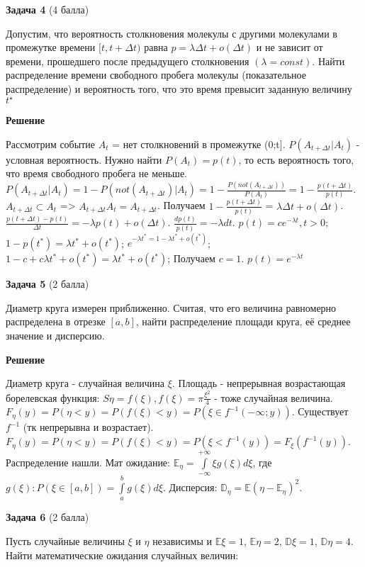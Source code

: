 \documentclass{article}
\begin{document}
\textbf{Задача 4} (4 балла)

Допустим, что вероятность столкновения молекулы с другими молекулами в
промежутке времени $[t, t + \Delta t)$ равна $p = \lambda\Delta t+o(\Delta t)$ и не зависит от времени, прошедшего
после предыдущего столкновения $(\lambda = const)$. Найти распределение времени свободного
пробега молекулы (показательное распределение) и вероятность того, что это время превысит заданную величину $t^{\star}$

\textbf{Решение}

Рассмотрим событие $A_t$ = нет столкновений в промежутке (0;t].
$P(A_{t+\Delta t}|A_t)$ - условная вероятность. Нужно найти $P(A_t) = p(t)$, то есть вероятность того, что время свободного пробега не меньше.
$P(A_{t+\Delta t}|A_t) = 1 - P(not(A_{t+\Delta t})|A_t) = 1 - \frac{P(not(A_{t+\Delta t}))}{P(A_t)} = 1 - \frac{p(t+\Delta t)}{p(t)}$.
$A_{t+\Delta t} \subset A_t$ => $A_{t+\Delta t} A_t = A_{t+\Delta t}$.
Получаем $1 - \frac{p(t+\Delta t)}{p(t)}$ = $\lambda\Delta t+o(\Delta t)$. 
$\frac{p(t+\Delta t) - p(t)}{\Delta t} = -\lambda p(t) + o(\Delta t)$.
$\frac{dp(t)}{p(t)} = -\lambda dt$.
$p(t) = ce^{-\lambda t}, t > 0$;
$1 - p(t^*) = \lambda t^* + o(t^*)$;
$e^{-\lambda t^* = 1 - \lambda t^* + o(t^*)}$;
$1 - c + c\lambda t^* + o(t^*) = \lambda t^* + o(t^*)$;
Получаем $c = 1$.
$p(t) = e^{-\lambda t}$


\textbf{Задача 5} (2 балла)

Диаметр круга измерен приближенно. Считая, что его величина равномерно распределена в отрезке $[a, b]$, найти распределение площади круга, её среднее значение и дисперсию.

\textbf{Решение}

Диаметр круга - случайная величина $\xi$. Площадь - непрерывная возрастающая борелевская функция: $S \eta = f(\xi), f(\xi) = \pi\frac{\xi^2}{4}$ - тоже случайная величина. $F_{\eta}(y) = P(\eta < y) = P(f(\xi) < y) = P(\xi \in f^{-1}(-\infty; y))$. Существует $f^{-1}$ (тк непрерывна и возрастает). 
$F_{\eta}(y) = P(\eta < y) = P(f(\xi) < y) = P(\xi < f^{-1}(y)) = F_{\xi}(f^{-1}(y))$. 
Распределение нашли.
Мат ожидание: $\mathbb{E}_\eta = \int\limits_{-\infty}^{+\infty} \xi g(\xi)d\xi$, где $g(\xi): P(\xi \in [a, b]) = \int\limits_a^b g(\xi) d\xi$.
Дисперсия: $\mathbb{D}_\eta = \mathbb{E}(\eta - \mathbb{E}_\eta)^2$.

\textbf{Задача 6} (2 балла)

Пусть случайные величины $\xi$  и $\eta$ независимы и $\mathbb{E}\xi = 1$, $\mathbb{E}\eta = 2$, $\mathbb{D}\xi = 1$,  $\mathbb{D}\eta = 4$. Найти математические ожидания случайных величин:
\end{document}

